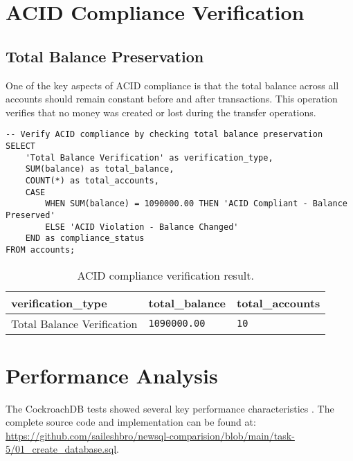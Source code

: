\section{ACID Compliance Verification}

\subsection{Total Balance Preservation}
One of the key aspects of ACID compliance is that the total balance across all accounts should remain constant before and after transactions. This operation verifies that no money was created or lost during the transfer operations.

\begin{verbatim}
-- Verify ACID compliance by checking total balance preservation
SELECT
    'Total Balance Verification' as verification_type,
    SUM(balance) as total_balance,
    COUNT(*) as total_accounts,
    CASE
        WHEN SUM(balance) = 1090000.00 THEN 'ACID Compliant - Balance Preserved'
        ELSE 'ACID Violation - Balance Changed'
    END as compliance_status
FROM accounts;
\end{verbatim}

\begin{table}[htbp]
  \centering
  \begin{tabular}{|l|l|l|}
    \hline
    \textbf{verification\_type} & \textbf{total\_balance} & \textbf{total\_accounts} \\
    \hline
    Total Balance Verification & \texttt{1090000.00} & \texttt{10} \\
    \hline
  \end{tabular}
  \caption{ACID compliance verification result.}
\end{table}

\section{Performance Analysis}

The CockroachDB tests showed several key performance characteristics \parencite{cockroachdb_paper}. The complete source code and implementation can be found at: \url{https://github.com/saileshbro/newsql-comparision/blob/main/task-5/01_create_database.sql}.

